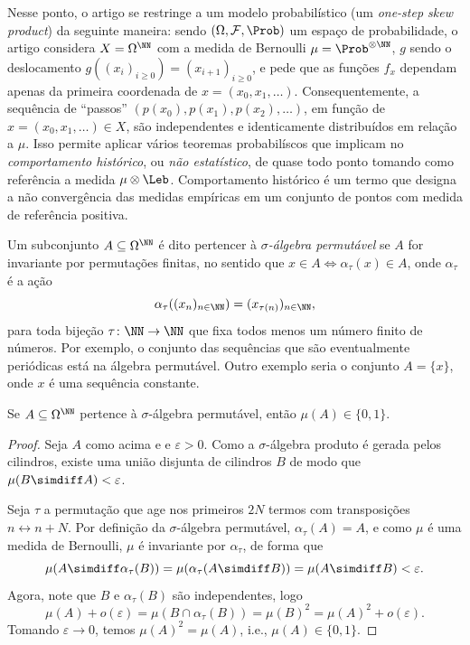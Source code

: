 \documentclass[../fapesp0]{subfiles}
\begin{document}
Nesse ponto, o artigo se restringe a um modelo probabilístico (um \emph{one-step skew product}) da seguinte maneira: sendo \((\Omega, \mathcal{F}, \Prob)\) um espaço de probabilidade, o artigo considera \(X = \Omega^{\NN}\) com a medida de Bernoulli \(\mu = \Prob^{\otimes \NN}\), \(g\) sendo o deslocamento \(g((x_i)_{i \geq 0}) = (x_{i + 1})_{i \geq 0}\), e pede que as funções \(f_x\) dependam apenas da primeira coordenada de \(x = (x_0,x_1,\dots)\). Consequentemente, a sequência de ``passos'' \((p(x_0), p(x_1), p(x_2), \dots)\), em função de \(x = (x_0,x_1,\dots) \in X\), são independentes e identicamente distribuídos em relação a \(\mu\). Isso permite aplicar vários teoremas probabilíscos que implicam no \emph{comportamento histórico}, ou \emph{não estatístico}, de quase todo ponto tomando como referência a medida \(\mu \otimes \Leb\). Comportamento histórico é um termo que designa a não convergência das medidas empíricas em um conjunto de pontos com medida de referência positiva.

Um subconjunto \(A \subseteq \Omega^{\NN}\) é dito pertencer à \emph{\(\sigma\)-álgebra permutável} se \(A\) for invariante por permutações finitas, no sentido que \(x \in A \Leftrightarrow \alpha_{\tau}(x) \in A\), onde \(\alpha_{\tau}\) é a ação
\begin{equation*}
  \alpha_{\tau}((x_n)_{n \in \NN}) = (x_{\tau(n)})_{n \in \NN},
\end{equation*}
para toda bijeção \(\tau \colon \NN \to \NN\) que fixa todos menos um número finito de números. Por exemplo, o conjunto das sequências que são eventualmente periódicas está na álgebra permutável. Outro exemplo seria o conjunto \(A = \{ x \}\), onde \(x\) é uma sequência constante.

\begin{proposition}\label{prop:hewitt-savage}
  Se \(A \subseteq \Omega^{\NN}\) pertence à \(\sigma\)-álgebra permutável, então \(\mu(A) \in \{ 0,1 \}\).
\end{proposition}

\begin{proof}
  Seja \(A\) como acima e e \(\varepsilon > 0\). Como a \(\sigma\)-álgebra produto é gerada pelos cilindros, existe uma união disjunta de cilindros \(B\) de modo que \(\mu(B \simdiff A) < \varepsilon\).

  Seja \(\tau\) a permutação que age nos primeiros \(2N\) termos com transposições \(n \leftrightarrow n + N\). Por definição da \(\sigma\)-álgebra permutável, \(\alpha_{\tau}(A) = A\), e como \(\mu\) é uma medida de Bernoulli, \(\mu\) é invariante por \(\alpha_{\tau}\), de forma que \[\mu(A \simdiff \alpha_{\tau}(B)) = \mu(\alpha_{\tau}(A \simdiff B)) = \mu(A \simdiff B) < \varepsilon.\]
  Agora, note que \(B\) e \(\alpha_{\tau}(B)\) são independentes, logo
  \[
    \mu(A) +o(\varepsilon) = \mu(B \cap \alpha_{\tau}(B)) = \mu(B)^2 = \mu(A)^2 + o(\varepsilon).
  \]
  Tomando \(\varepsilon \to 0\), temos \(\mu(A)^2 = \mu(A)\), i.e., \(\mu(A) \in \{ 0,1 \}\).
\end{proof}
\end{document}
